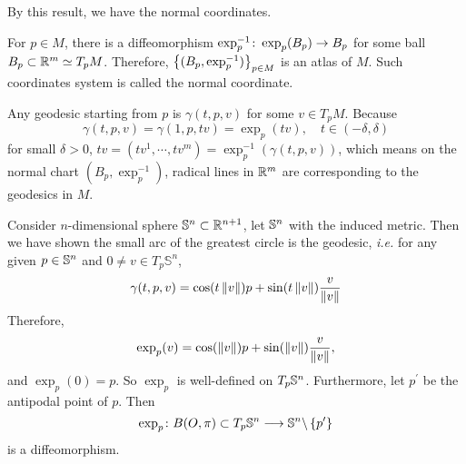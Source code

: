 By this result, we have the normal coordinates.
\begin{defn}
	For $p\in M$, there is a diffeomorphism $\exp_p^{-1} \colon \exp_p(B_p) \rightarrow B_p$ for some ball $B_p \subset \mathbb{R}^m\simeq T_pM$. Therefore, $\left\{(B_p,\exp_p^{-1})\right\}_{p \in M}$ is an atlas of $M$. Such coordinates system is called the normal coordinate.
\end{defn}
\begin{rmk}
	Any geodesic starting from $p$ is $\gamma(t,p,v)$ for some $v \in T_pM$. Because
	\begin{equation*}
		\gamma(t,p,v) = \gamma(1,p,tv) = \exp_p(tv),\quad t \in (-\delta,\delta)
	\end{equation*}
	for small $\delta > 0$, $tv = (tv^1,\cdots,tv^m) = \exp_p^{-1}(\gamma(t,p,v))$, which means on the normal chart $(B_p,\exp_p^{-1})$, radical lines in $\mathbb{R}^m$ are corresponding to the geodesics in $M$.
\end{rmk}

\begin{exam}
	Consider $n$-dimensional sphere $\mathbb{S}^n \subset \mathbb{R}^{n+1}$, let $\mathbb{S}^n$ with the induced metric. Then we have shown the small arc of the greatest circle is the geodesic, \emph{i.e.} for any given $p \in \mathbb{S}^n$ and $0 \neq v \in T_p\mathbb{S}^n$,
	\begin{equation*}
		\gamma(t,p,v) = \cos(t\left\lVert v\right\lVert)p+\sin(t\left\lVert v\right\lVert)\frac{v}{\left\lVert v\right\lVert}
	\end{equation*}
	Therefore,
	\begin{equation*}
		\exp_p(v) = \cos(\left\lVert v\right\lVert)p+\sin(\left\lVert v\right\lVert)\frac{v}{\left\lVert v\right\lVert},
	\end{equation*}
	and $\exp_p(0) = p$. So $\exp_p$ is well-defined on $T_p\mathbb{S}^n$. Furthermore, let $p^\prime$ be the antipodal point of $p$. Then
	\begin{equation*}
		\exp_p \colon B(O,\pi) \subset T_p\mathbb{S}^n \longrightarrow \mathbb{S}^n \backslash \left\{p^\prime\right\}
	\end{equation*}
	is a diffeomorphism.
\end{exam}

